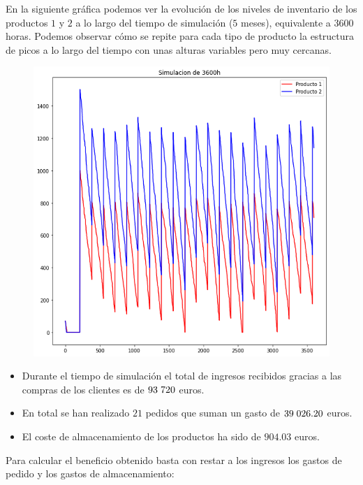 \documentclass[a4paper,12pt]{article}
\begin{document}
	En la siguiente gráfica podemos ver la evolución de los niveles de inventario de los productos $1$
y $2$ a lo largo del tiempo de simulación ($5$ meses), equivalente a $3600$ horas. Podemos
observar cómo se repite para cada tipo de producto la estructura de picos a lo largo del tiempo
con unas alturas variables pero muy cercanas.
	\begin{figure}[H]
		\centering
		\includegraphics[width=\textwidth]{include/simulacion/simulacion_3600h.png}
	\end{figure}

	\begin{itemize}
		\item Durante el tiempo de simulación el total de ingresos recibidos gracias a las compras de
	los clientes es de $93\hspace{1mm}720$ euros.

		\item En total se han realizado $21$ pedidos que suman un gasto de $39\hspace{1mm}026.20$ euros.

		\item El coste de almacenamiento de los productos ha sido de $904.03$ euros.
	\end{itemize}

	Para calcular el beneficio obtenido basta con restar a los ingresos los gastos de pedido y los gastos
de almacenamiento:
\end{document}
